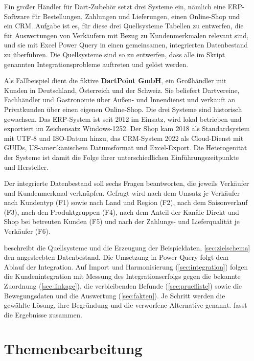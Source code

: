 \documentclass[a4paper,12pt]{article}
\begin{document}
Ein großer Händler für Dart-Zubehör setzt drei Systeme ein, nämlich eine ERP-Software für Bestellungen, Zahlungen und Lieferungen, einen Online-Shop und ein CRM. Aufgabe ist es, für diese drei Quellsysteme Tabellen zu entwerfen, die für Auswertungen von Verkäufern mit Bezug zu Kundenmerkmalen relevant sind, und sie mit Excel Power Query in einen gemeinsamen, integrierten Datenbestand zu überführen. Die Quellsysteme sind so zu entwerfen, dass alle im Skript genannten Integrationsprobleme auftreten und gelöst werden.

Als Fallbeispiel dient die fiktive \textbf{DartPoint GmbH}, ein Großhändler mit Kunden in Deutschland, Österreich und der Schweiz. Sie beliefert Dartvereine, Fachhändler und Gastronomie über Außen- und Innendienst und verkauft an Privatkunden über einen eigenen Online-Shop. Die drei Systeme sind historisch gewachsen. Das ERP-System ist seit 2012 im Einsatz, wird lokal betrieben und exportiert im Zeichensatz Windows-1252. Der Shop kam 2018 als Standardsystem mit UTF-8 und ISO-Datum hinzu, das CRM-System 2022 als Cloud-Dienst mit GUIDs, US-amerikanischem Datumsformat und Excel-Export. Die Heterogenität der Systeme ist damit die Folge ihrer unterschiedlichen Einführungszeitpunkte und Hersteller.

Der integrierte Datenbestand soll sechs Fragen beantworten, die jeweils Verkäufer und Kundenmerkmal verknüpfen. Gefragt wird nach dem Umsatz je Verkäufer nach Kundentyp (F1) sowie nach Land und Region (F2), nach dem Saisonverlauf (F3), nach den Produktgruppen (F4), nach dem Anteil der Kanäle Direkt und Shop bei betreuten Kunden (F5) und nach der Zahlungs- und Lieferqualität je Verkäufer (F6).

 beschreibt die Quellsysteme und die Erzeugung der Beispieldaten, \cref{sec:zielschema} den angestrebten Datenbestand. Die Umsetzung in Power Query folgt dem Ablauf der Integration. Auf Import und Harmonisierung (\cref{sec:integration}) folgen die Kundenintegration mit Messung des Integrationserfolgs gegen die bekannte Zuordnung (\cref{sec:linkage}), die verbleibenden Befunde (\cref{sec:pruefliste}) sowie die Bewegungsdaten und die Auswertung (\cref{sec:fakten}). Je Schritt werden die gewählte Lösung, ihre Begründung und die verworfene Alternative genannt.  fasst die Ergebnisse zusammen.

\section{Themenbearbeitung}\label{sec:themen}
\end{document}
